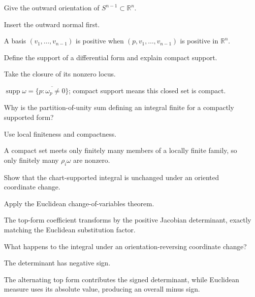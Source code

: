 \begin{exercise}\label{exr:vii10-12}
Give the outward orientation of $S^{n-1}\subset\mathbb R^n$.
\end{exercise}
\begin{hint}
Insert the outward normal first.
\end{hint}
\begin{solution}
A basis $(v_1,\ldots,v_{n-1})$ is positive when $(p,v_1,\ldots,v_{n-1})$ is positive in $\mathbb R^n$.
\end{solution}

\begin{exercise}\label{exr:vii10-13}
Define the support of a differential form and explain compact support.
\end{exercise}
\begin{hint}
Take the closure of its nonzero locus.
\end{hint}
\begin{solution}
$\operatorname{supp}\omega=\overline{\{p:\omega_p\ne0\}}$; compact support means this closed set is compact.
\end{solution}

\begin{exercise}\label{exr:vii10-14}
Why is the partition-of-unity sum defining an integral finite for a compactly supported form?
\end{exercise}
\begin{hint}
Use local finiteness and compactness.
\end{hint}
\begin{solution}
A compact set meets only finitely many members of a locally finite family, so only finitely many $\rho_i\omega$ are nonzero.
\end{solution}

\begin{exercise}\label{exr:vii10-15}
Show that the chart-supported integral is unchanged under an oriented coordinate change.
\end{exercise}
\begin{hint}
Apply the Euclidean change-of-variables theorem.
\end{hint}
\begin{solution}
The top-form coefficient transforms by the positive Jacobian determinant, exactly matching the Euclidean substitution factor.
\end{solution}

\begin{exercise}\label{exr:vii10-16}
What happens to the integral under an orientation-reversing coordinate change?
\end{exercise}
\begin{hint}
The determinant has negative sign.
\end{hint}
\begin{solution}
The alternating top form contributes the signed determinant, while Euclidean measure uses its absolute value, producing an overall minus sign.
\end{solution}

